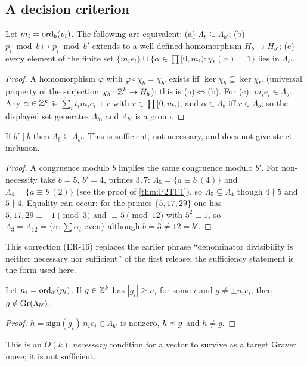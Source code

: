 \subsection{A decision criterion}
\begin{theorem}\label{thm:P2T1}
Let $m_i=\operatorname{ord}_b(p_i)$. The following are equivalent: (a) $\Lambda_b\subseteq\Lambda_{b'}$; (b) $p_i\bmod b\mapsto p_i\bmod b'$ extends to a well-defined homomorphism $H_b\to H_{b'}$; (c) every element of the finite set $\{m_ie_i\}\cup\{\alpha\in\prod[0,m_i):\chi_b(\alpha)=1\}$ lies in $\Lambda_{b'}$.
\end{theorem}
\begin{proof}
A homomorphism $\varphi$ with $\varphi\circ\chi_b=\chi_{b'}$ exists iff $\ker\chi_b\subseteq\ker\chi_{b'}$ (universal property of the surjection $\chi_b:\mathbb Z^k\to H_b$); this is (a)$\iff$(b). For (c): $m_ie_i\in\Lambda_b$. Any $\alpha\in\mathbb Z^k$ is $\sum_it_im_ie_i+r$ with $r\in\prod[0,m_i)$, and $\alpha\in\Lambda_b$ iff $r\in\Lambda_b$; so the displayed set generates $\Lambda_b$, and $\Lambda_{b'}$ is a group. \qedhere
\end{proof}
\begin{corollary}[denominators]\label{cor:denominators}
If $b'\mid b$ then $\Lambda_b\subseteq\Lambda_{b'}$. This is sufficient, not necessary, and does not give strict inclusion.
\end{corollary}
\begin{proof}
A congruence modulo $b$ implies the same congruence modulo $b'$. For non-necessity take $b=5$, $b'=4$, primes $3,7$: $\Lambda_5=\{a\equiv b\ (4)\}$ and $\Lambda_4=\{a\equiv b\ (2)\}$ (see the proof of \cref{thm:P2TF1}), so $\Lambda_5\subsetneq\Lambda_4$ though $4\nmid5$ and $5\nmid4$. Equality can occur: for the primes $\{5,17,29\}$ one has $5,17,29\equiv-1\pmod 3$ and $\equiv5\pmod{12}$ with $5^2\equiv1$, so $\Lambda_3=\Lambda_{12}=\{\alpha:\sum\alpha_i\text{ even}\}$ although $b=3\neq12=b'$. \qedhere
\end{proof}
This correction (ER-16) replaces the earlier phrase ``denominator divisibility is neither necessary nor sufficient'' of the first release; the sufficiency statement is the form used here.

\begin{lemma}\label{lem:orderrule}
Let $n_i=\operatorname{ord}_{b'}(p_i)$. If $g\in\mathbb Z^k$ has $|g_i|\ge n_i$ for some $i$ and $g\ne\pm n_ie_i$, then $g\notin\operatorname{Gr}(\Lambda_{b'})$.
\end{lemma}
\begin{proof}
$h=\mathrm{sign}(g_i)\,n_ie_i\in\Lambda_{b'}$ is nonzero, $h\preceq g$ and $h\ne g$. \qedhere
\end{proof}
This is an $O(k)$ \emph{necessary} condition for a vector to survive as a target Graver move; it is not sufficient.

